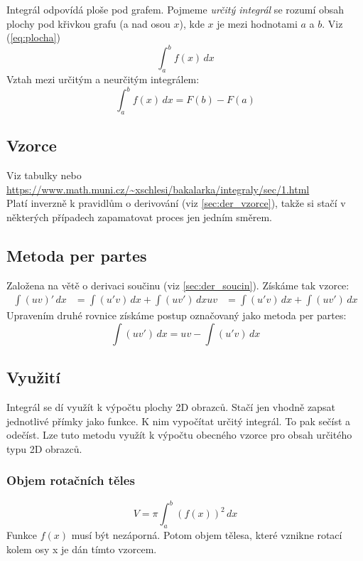 \documentclass[12pt]{article}
\begin{document}
Integrál odpovídá ploše pod grafem. Pojmeme \emph{určitý integrál} se rozumí obsah plochy pod křivkou grafu (a nad osou $x$), kde $x$ je mezi hodnotami $a$ a $b$. Viz (\ref{eq:plocha})
\begin{equation}
\label{eq:plocha}
\int_a^b f(x)\,dx
\end{equation}
Vztah mezi určitým a neurčitým integrálem:
\begin{equation}
\int_{a}^{b} \! f(x)  \,dx = F(b) - F(a)
\end{equation}
\subsection{Vzorce}
Viz tabulky nebo \url{https://www.math.muni.cz/~xschlesi/bakalarka/integraly/sec/1.html}\\ Platí inverzně k pravidlům o derivování (viz \ref{sec:der_vzorce}), takže si stačí v některých případech zapamatovat proces jen jedním směrem.
\subsection{Metoda per partes}
Založena na větě o derivaci součinu (viz \ref{sec:der_soucin}). Získáme tak vzorce:
\begin{align}
\int (uv)'\,dx &= \int(u'v)\,dx + \int(uv')\,dx
uv &= \int(u'v)\,dx + \int(uv')\,dx
\end{align}
Upravením druhé rovnice získáme postup označovaný jako metoda per partes:
\begin{equation}
\int(uv')\,dx = uv - \int(u'v)\,dx
\end{equation}

\subsection{Využití}
\label{sec:vyuziti_integralu}
Integrál se dí využít k výpočtu plochy 2D obrazců. Stačí jen vhodně zapsat jednotlivé přímky jako funkce. K nim vypočítat určitý integrál. To pak sečíst a odečíst. Lze tuto metodu využít k výpočtu obecného vzorce pro obsah určitého typu 2D obrazců.
\subsubsection{Objem rotačních těles}
\begin{equation}
V = \pi \int_a^b (f(x))^2 \,d x
\end{equation}
Funkce $f(x)$ musí být nezáporná. Potom objem tělesa, které vznikne rotací kolem osy x je dán tímto vzorcem.
\end{document}
